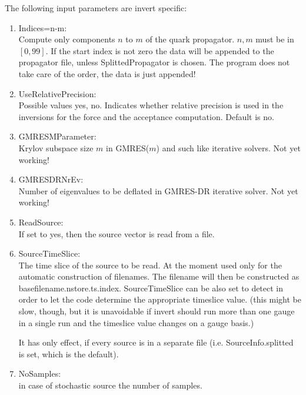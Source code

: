 The following input parameters are {\ttfamily invert} specific:
\begin{enumerate}
\item {\ttfamily Indices=n-m}:\\
  Compute only components $n$ to $m$ of the quark propagator. $n,m$ must
  be in $[0,99]$. If the start index is not zero the data will be
  appended to the propagator file, unless {\ttfamily
    SplittedPropagator} is chosen. The program does not take care of the
  order, the data is just appended!

\item {\ttfamily UseRelativePrecision}:\\
  Possible values {\ttfamily yes, no}. Indicates whether relative
  precision is used in the inversions for the force and the acceptance
  computation. Default is no.
  
\item {\ttfamily GMRESMParameter}:\\
  Krylov subspace size $m$ in GMRES($m$) and such like iterative
  solvers. Not yet working!

\item {\ttfamily GMRESDRNrEv}:\\
  Number of eigenvalues to be deflated in GMRES-DR iterative
  solver. Not yet working!

\item {\ttfamily ReadSource}:\\
  If set to yes, then the source vector is read from a file.

\item {\ttfamily SourceTimeSlice}:\\
  The time slice of the source to be read. At
  the moment used only for
  the automatic construction of filenames. The filename will then be
  constructed as {\ttfamily basefilename.nstore.ts.index}.
  {\ttfamily SourceTimeSlice} can be also set to {\ttfamily detect} in
  order to let the code determine the appropriate timeslice
  value. (this might be slow, though, but it is unavoidable if
  {\ttfamily invert} should run more than one gauge in a single run
  and the timeslice value changes on a gauge basis.)

  It has only effect, if every source is in a separate file
  (i.e. SourceInfo.splitted is set, which is the default).

\item {\ttfamily NoSamples}:\\
  in case of stochastic source the number of samples.


\end{enumerate}
